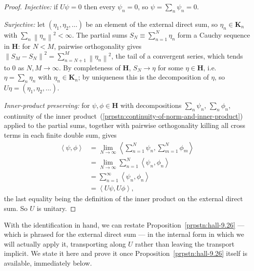 \begin{proof}
\textit{Injective:} if $U\psi = 0$ then every $\psi_n = 0$, so $\psi = \sum_n \psi_n = 0$.

\textit{Surjective:} let $(\eta_1,\eta_2,\ldots)$ be an element of the external direct sum, so $\eta_n \in \mathbf{K}_n$ with $\sum_n \left\| \eta_n \right\|^2 < \infty$. The partial sums $S_N \equiv \sum_{n=1}^N \eta_n$ form a Cauchy sequence in $\mathbf{H}$: for $N < M$, pairwise orthogonality gives $\left\| S_M - S_N \right\|^2 = \sum_{n=N+1}^M \left\| \eta_n \right\|^2$, the tail of a convergent series, which tends to $0$ as $N,M\to\infty$. By completeness of $\mathbf{H}$, $S_N \to \eta$ for some $\eta \in \mathbf{H}$, i.e. $\eta = \sum_n \eta_n$ with $\eta_n \in \mathbf{K}_n$; by uniqueness this is the decomposition of $\eta$, so $U\eta = (\eta_1,\eta_2,\ldots)$.

\textit{Inner-product preserving:} for $\psi,\phi \in \mathbf{H}$ with decompositions $\sum_n\psi_n$, $\sum_n\phi_n$, continuity of the inner product~(\ref{prpstn:continuity-of-norm-and-inner-product}) applied to the partial sums, together with pairwise orthogonality killing all cross terms in each finite double sum, gives
\begin{align}
    \left< \psi, \phi \right> &= \lim_{N\to\infty} \left< \sum_{n=1}^N \psi_n, \sum_{m=1}^N \phi_m \right> \\
                &= \lim_{N\to\infty} \sum_{n=1}^N \left< \psi_n, \phi_n \right> \\
                &= \sum_{n=1}^\infty \left< \psi_n, \phi_n \right> \\
                &= \left< U\psi, U\phi \right>,
\end{align}
the last equality being the definition of the inner product on the external direct sum. So $U$ is unitary.
\end{proof}

With the identification in hand, we can restate Proposition~\ref{prpstn:hall-9.26} — which is phrased for the external direct sum — in the internal form in which we will actually apply it, transporting along $U$ rather than leaving the transport implicit. We state it here and prove it once Proposition~\ref{prpstn:hall-9.26} itself is available, immediately below.

